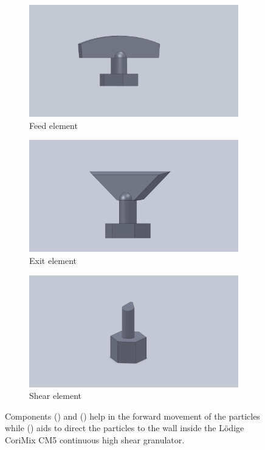 \documentclass[preprint,11pt,authoryear]{elsarticle}
\begin{document}
\begin{figure}
\begin{subfigure}{.3\textwidth}
\centering
\includegraphics[scale=0.075]{feed_element.pdf}	      
\caption{Feed element}
\label{fig:mthds_dem_feed_element}
\end{subfigure}%
\begin{subfigure}{.3\textwidth}
	\centering
	\includegraphics[scale=0.075]{exit_element.pdf}
	\caption{Exit element}
	\label{fig:mthds_dem_exit_element}
\end{subfigure}
\begin{subfigure}{.3\textwidth}
\centering
\includegraphics[scale=0.075]{shear_element.pdf}
\caption{Shear element}
\label{fig:mthds_dem_shear_element}
\end{subfigure}
\caption{Components () and () help in the forward 
movement of the particles while () aids to direct the particles to the wall 
inside the L\"{o}dige CoriMix CM5 continuous high shear granulator.}
\label{fig:mthds_dem_charles_fig5pt3and4_blades_n_isometric}
\end{figure}     
\end{document}
